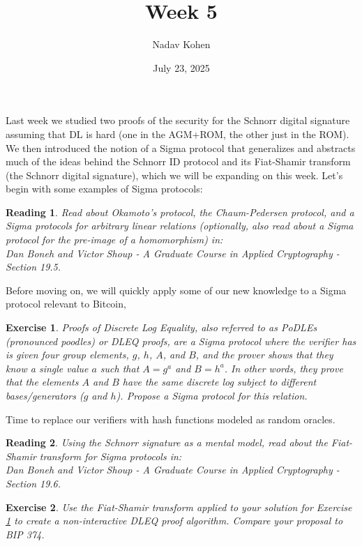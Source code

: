 \documentclass[12pt]{article}
\newtheorem{exercise}{Exercise}
\newtheorem{reading}{Reading}
\theoremstyle{definition}
\theoremstyle{remark}
\theoremstyle{definition}
\begin{document}
\title{Week 5}
\author{Nadav Kohen}
\date{July 23, 2025}
\maketitle

Last week we studied two proofs of the security for the Schnorr digital signature assuming that DL is hard (one in the AGM+ROM, the other just in the ROM). We then introduced the notion of a Sigma protocol that generalizes and abstracts much of the ideas behind the Schnorr ID protocol and its Fiat-Shamir transform (the Schnorr digital signature), which we will be expanding on this week. Let's begin with some examples of Sigma protocols:

\begin{reading}
Read about Okamoto's protocol, the Chaum-Pedersen protocol, and a Sigma protocols for arbitrary linear relations (optionally, also read about a Sigma protocol for the pre-image of a homomorphism) in:\\
Dan Boneh and Victor Shoup - A Graduate Course in
Applied Cryptography - Section 19.5.
\end{reading}

Before moving on, we will quickly apply some of our new knowledge to a Sigma protocol relevant to Bitcoin,

\begin{exercise}\label{ex:dleq}
Proofs of Discrete Log Equality, also referred to as PoDLEs (pronounced poodles) or DLEQ proofs, are a Sigma protocol where the verifier has is given four group elements, $g$, $h$, $A$, and $B$, and the prover shows that they know a single value $a$ such that $A = g^a$ and $B = h^a$. In other words, they prove that the elements $A$ and $B$ have the same discrete log subject to different bases/generators ($g$ and $h$). Propose a Sigma protocol for this relation.
\end{exercise}

Time to replace our verifiers with hash functions modeled as random oracles.

\begin{reading}
Using the Schnorr signature as a mental model, read about the Fiat-Shamir transform for Sigma protocols in:\\
Dan Boneh and Victor Shoup - A Graduate Course in
Applied Cryptography - Section 19.6.
\end{reading}

\begin{exercise}
Use the Fiat-Shamir transform applied to your solution for Exercise \ref{ex:dleq} to create a non-interactive DLEQ proof algorithm. Compare your proposal to BIP 374.
\end{exercise}
\end{document}
